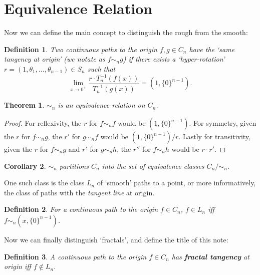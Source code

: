 \documentclass{article}
\theoremstyle{plain}
\newtheorem{definition}{Definition}[section]
\newtheorem{theorem}{Theorem}[section]
\newtheorem{corollary}[theorem]{Corollary}
\begin{document}
\section{Equivalence Relation}
Now we can define the main concept to distinguish the rough from the smooth:
\begin{definition}\label{equiv}
Two continuous paths to the origin $f, g \in C_n$ have the `same tangency at origin' (we notate as $f \sim_n g$) if there exists a `hyper-rotation' $r = (1, \theta_1, \ldots, \theta_{n-1}) \in S_n$ such that $$\lim_{x\rightarrow 0^{+}} \frac{r \cdot T_n^{-1}(f(x))}{T_n^{-1}(g(x))} = (1, \{0\}^{n-1}).$$
\end{definition}
\begin{theorem}
$\sim_n$ is an equivalence relation on $C_n$.
\end{theorem}
\begin{proof}
For reflexivity, the $r$ for $f \sim_n f$ would be $(1, \{0\}^{n-1})$. For symmetry, given the $r$ for $f \sim_n g$, the $r'$ for $g \sim_n f$ would be $(1, \{0\}^{n-1})/r$. Lastly for transitivity, given the $r$ for $f \sim_n g$ and $r'$ for $g \sim_n h$, the $r''$ for $f \sim_n h$ would be $r \cdot r'$.
\end{proof}
\begin{corollary}
$\sim_n$ partitions $C_n$ into the set of equivalence classes $C_n / \sim_n$.
\end{corollary}
One such class is the class $L_n$ of `smooth' paths to a point, or more informatively, the class of paths with the \textit{tangent line} at origin.
\begin{definition}
For a continuous path to the origin $f \in C_n$, $f \in L_n$ iff $f \sim_n (x, \{0\}^{n-1})$.
\end{definition}
Now we can finally distinguish `fractals', and define the title of this note:
\begin{definition}
A continuous path to the origin $f \in C_n$  has \textbf{fractal tangency} at origin iff $f \not\in L_n$.
\end{definition}
\end{document}
